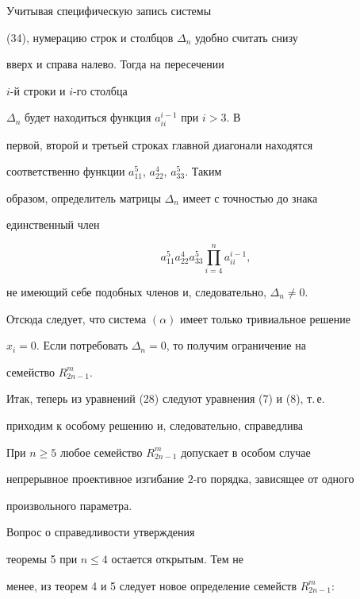  


Учитывая специфическую запись системы 


(34), нумерацию строк и столбцов $\Delta_n$ удобно считать снизу


вверх и справа налево. Тогда на пересечении


$i$-й строки и $i$-го столбца


$\Delta_n$ будет находиться функция $a^{i-1}_{ii}$ при $i>3$. В 


первой, второй и третьей строках главной диагонали находятся 


соответственно функции $a^5_{11}$, $a^4_{22}$, $a^5_{33}$. Таким 


образом, определитель матрицы $\Delta_n$ имеет с точностью до знака 


единственный член 


$$ 


a^5_{11}a^4_{22}a^5_{33}\prod^n_{i=4}a^{i-1}_{ii}, 


$$ 


не имеющий себе подобных членов и, следовательно, $\Delta_n\ne0$. 


Отсюда следует, что система $(\alpha)$ имеет только тривиальное решение 


$x_i=0$. Если потребовать $\Delta_n=0$, то получим ограничение на 


семейство $R^m_{2n-1}$. 


 


Итак, теперь из уравнений (28) следуют уравнения (7) и (8), т.\,е. 


приходим к особому решению и, следовательно, справедлива 


 


\begin{thm} 


При $n\ge5$ любое семейство $R^m_{2n-1}$ допускает в особом случае 


непрерывное проективное изгибание $2$-го порядка, зависящее от одного 


произвольного параметра. 


\end{thm} 


 


Вопрос о справедливости утверждения


теоремы 5 при $n\le4$ остается открытым. Тем не 


менее, из теорем 4 и 5 следует новое определение семейств $R^m_{2n-1}$: 


